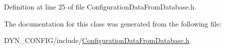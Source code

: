 Definition at line 25 of file Configuration\+Data\+From\+Database.\+h.



The documentation for this class was generated from the following file\+:\begin{DoxyCompactItemize}
\item 
D\+Y\+N\+\_\+\+C\+O\+N\+F\+I\+G/include/\hyperlink{ConfigurationDataFromDatabase_8h}{Configuration\+Data\+From\+Database.\+h}\end{DoxyCompactItemize}
